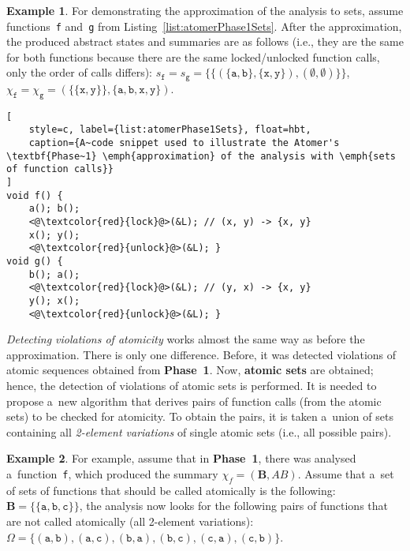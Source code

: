 \documentclass{ExcelAtFIT}
\theoremstyle{definition}
\newtheorem{example}{Example}[section]
\begin{document}
\begin{example}
    For demonstrating the approximation of the analysis to sets, assume functions~\texttt{f} and~\texttt{g} from Listing~\ref{list:atomerPhase1Sets}. After the approximation, the produced abstract states and summaries are as follows (i.e., they are the same for both functions because there are the same locked/unlocked function calls, only the order of calls differs): $ s_\mathtt{f} = s_\mathtt{g} = \{\{({\{\mathtt{a}, \mathtt{b}\}}, {\{\mathtt{x}, \mathtt{y}\}}), {(\emptyset, \emptyset)}\}\} $, $ \chi_\mathtt{f} = \chi_\mathtt{g} = ({\{\{\mathtt{x}, \mathtt{y}\}\}}, {\{\mathtt{a}, \mathtt{b}, \mathtt{x}, \mathtt{y}\}}) $.
\end{example}

\begin{lstlisting}[
    style=c, label={list:atomerPhase1Sets}, float=hbt,
    caption={A~code snippet used to illustrate the Atomer's \textbf{Phase~1} \emph{approximation} of the analysis with \emph{sets of function calls}}
]
void f() {
    a(); b();
    <@\textcolor{red}{lock}@>(&L); // (x, y) -> {x, y}
    x(); y();
    <@\textcolor{red}{unlock}@>(&L); }
void g() {
    b(); a();
    <@\textcolor{red}{lock}@>(&L); // (y, x) -> {x, y}
    y(); x();
    <@\textcolor{red}{unlock}@>(&L); }
\end{lstlisting}

\emph{Detecting violations of atomicity} works almost the same way as before the approximation. There is only one difference. Before, it was detected violations of atomic sequences obtained from \textbf{Phase~1}. Now, \textbf{atomic sets} are obtained; hence, the detection of violations of atomic sets is performed. It is needed to propose a~new algorithm that derives pairs of function calls (from the atomic sets) to be checked for atomicity. To obtain the pairs, it is taken a~union of sets containing all \emph{2-element variations} of single atomic sets (i.e., all possible pairs).

\begin{example}
    \sloppy
    For example, assume that in \textbf{Phase~1}, there was analysed a~function~\texttt{f}, which produced the summary $ \chi_f = {(\boldsymbol{B}, AB)} $. Assume that a~set of sets of functions that should be called atomically is the following: $ \boldsymbol{B} = \{{\{\mathtt{a}, \mathtt{b}, \mathtt{c}\}}\} $, the analysis now looks for the following pairs of functions that are not called atomically (all 2-element variations): $ \Omega = \{{(\mathtt{a}, \mathtt{b})}, {(\mathtt{a}, \mathtt{c})}, {(\mathtt{b}, \mathtt{a})}, {(\mathtt{b}, \mathtt{c})}, {(\mathtt{c}, \mathtt{a})}, {(\mathtt{c}, \mathtt{b})}\} $.
\end{example}
\end{document}
